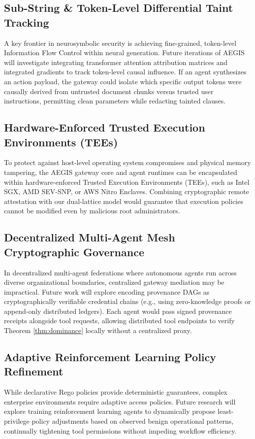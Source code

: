 \subsection{Sub-String \& Token-Level Differential Taint Tracking}
A key frontier in neurosymbolic security is achieving fine-grained, token-level Information Flow Control within neural generation. Future iterations of AEGIS will investigate integrating transformer attention attribution matrices and integrated gradients to track token-level causal influence. If an agent synthesizes an action payload, the gateway could isolate which specific output tokens were causally derived from untrusted document chunks versus trusted user instructions, permitting clean parameters while redacting tainted clauses.

\subsection{Hardware-Enforced Trusted Execution Environments (TEEs)}
To protect against host-level operating system compromises and physical memory tampering, the AEGIS gateway core and agent runtimes can be encapsulated within hardware-enforced Trusted Execution Environments (TEEs), such as Intel SGX, AMD SEV-SNP, or AWS Nitro Enclaves. Combining cryptographic remote attestation with our dual-lattice model would guarantee that execution policies cannot be modified even by malicious root administrators.

\subsection{Decentralized Multi-Agent Mesh Cryptographic Governance}
In decentralized multi-agent federations where autonomous agents run across diverse organizational boundaries, centralized gateway mediation may be impractical. Future work will explore encoding provenance DAGs as cryptographically verifiable credential chains (e.g., using zero-knowledge proofs or append-only distributed ledgers). Each agent would pass signed provenance receipts alongside tool requests, allowing distributed tool endpoints to verify Theorem \ref{thm:dominance} locally without a centralized proxy.

\subsection{Adaptive Reinforcement Learning Policy Refinement}
While declarative Rego policies provide deterministic guarantees, complex enterprise environments require adaptive access policies. Future research will explore training reinforcement learning agents to dynamically propose least-privilege policy adjustments based on observed benign operational patterns, continually tightening tool permissions without impeding workflow efficiency.

